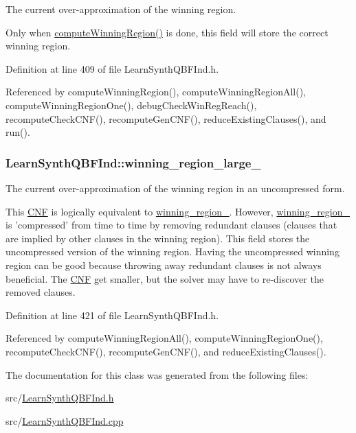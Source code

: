 The current over-\/approximation of the winning region. 

Only when \hyperlink{classLearnSynthQBFInd_a41593ccf692af8948f4b1255fb13ffe5}{compute\-Winning\-Region()} is done, this field will store the correct winning region. 

Definition at line 409 of file Learn\-Synth\-Q\-B\-F\-Ind.\-h.



Referenced by compute\-Winning\-Region(), compute\-Winning\-Region\-All(), compute\-Winning\-Region\-One(), debug\-Check\-Win\-Reg\-Reach(), recompute\-Check\-C\-N\-F(), recompute\-Gen\-C\-N\-F(), reduce\-Existing\-Clauses(), and run().

\hypertarget{classLearnSynthQBFInd_a333c9336ba28a2c41f252a3051a59581}{
\subsubsection[{winning\-\_\-region\-\_\-large\-\_\-}]{ Learn\-Synth\-Q\-B\-F\-Ind\-::winning\-\_\-region\-\_\-large\-\_\-\hspace{0.3cm}{\ttfamily [protected]}}}\label{classLearnSynthQBFInd_a333c9336ba28a2c41f252a3051a59581}


The current over-\/approximation of the winning region in an uncompressed form. 

This \hyperlink{classCNF}{C\-N\-F} is logically equivalent to \hyperlink{classLearnSynthQBFInd_ab8ce6031137413e90e0626bbdc734be0}{winning\-\_\-region\-\_\-}. However, \hyperlink{classLearnSynthQBFInd_ab8ce6031137413e90e0626bbdc734be0}{winning\-\_\-region\-\_\-} is 'compressed' from time to time by removing redundant clauses (clauses that are implied by other clauses in the winning region). This field stores the uncompressed version of the winning region. Having the uncompressed winning region can be good because throwing away redundant clauses is not always beneficial. The \hyperlink{classCNF}{C\-N\-F} get smaller, but the solver may have to re-\/discover the removed clauses. 

Definition at line 421 of file Learn\-Synth\-Q\-B\-F\-Ind.\-h.



Referenced by compute\-Winning\-Region\-All(), compute\-Winning\-Region\-One(), recompute\-Check\-C\-N\-F(), recompute\-Gen\-C\-N\-F(), and reduce\-Existing\-Clauses().



The documentation for this class was generated from the following files\-:\begin{DoxyCompactItemize}
\item 
src/\hyperlink{LearnSynthQBFInd_8h}{Learn\-Synth\-Q\-B\-F\-Ind.\-h}\item 
src/\hyperlink{LearnSynthQBFInd_8cpp}{Learn\-Synth\-Q\-B\-F\-Ind.\-cpp}\end{DoxyCompactItemize}

